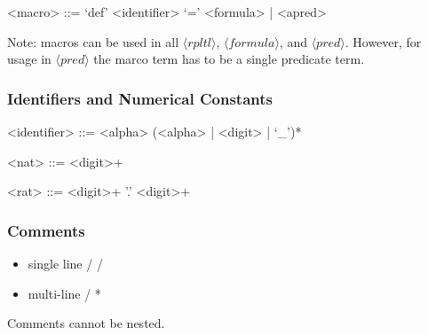 \begin{grammar}
<macro>  ::= `def' <identifier> `=' <formula> | <apred>
\end{grammar}

\noindent
Note: macros can be used in all $\langle \mathit{rpltl}\rangle$,  $\langle \mathit{formula}\rangle$, and $\langle\mathit{pred}\rangle$. However, for usage in $\langle\mathit{pred}\rangle$ the marco term has to be a single predicate term.

\subsubsection{Identifiers and Numerical Constants}

\begin{grammar}
<identifier>      ::= <alpha> (<alpha> | <digit> | `_')*

<nat>             ::= <digit>+

<rat>            ::= <digit>+ '.' <digit>+
\end{grammar}

\subsubsection{Comments}
\begin{itemize}
\item single line  \textsf{/ /}
\item  multi-line \textsf{/ *}
\end{itemize}

\noindent
Comments cannot be nested.
